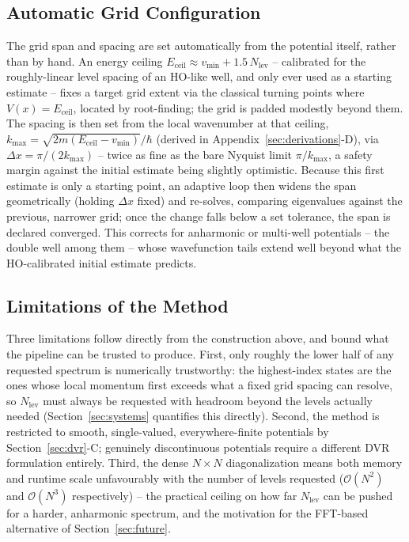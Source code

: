 \documentclass[10pt,conference]{IEEEtran}
\begin{document}
\subsection{Automatic Grid Configuration}
The grid span and spacing are set automatically from the potential itself, rather than by hand. An energy ceiling $E_{\text{ceil}}\approx v_{\min}+1.5\,N_{\text{lev}}$ -- calibrated for the roughly-linear level spacing of an HO-like well, and only ever used as a starting estimate -- fixes a target grid extent via the classical turning points where $V(x)=E_{\text{ceil}}$, located by root-finding; the grid is padded modestly beyond them. The spacing is then set from the local wavenumber at that ceiling, $k_{\max}=\sqrt{2m(E_{\text{ceil}}-v_{\min})}/\hbar$ (derived in Appendix~\ref{sec:derivations}-D), via $\Delta x = \pi/(2k_{\max})$ -- twice as fine as the bare Nyquist limit $\pi/k_{\max}$, a safety margin against the initial estimate being slightly optimistic. Because this first estimate is only a starting point, an adaptive loop then widens the span geometrically (holding $\Delta x$ fixed) and re-solves, comparing eigenvalues against the previous, narrower grid; once the change falls below a set tolerance, the span is declared converged. This corrects for anharmonic or multi-well potentials -- the double well among them -- whose wavefunction tails extend well beyond what the HO-calibrated initial estimate predicts.

\subsection{Limitations of the Method}
Three limitations follow directly from the construction above, and bound what the pipeline can be trusted to produce. First, only roughly the lower half of any requested spectrum is numerically trustworthy: the highest-index states are the ones whose local momentum first exceeds what a fixed grid spacing can resolve, so $N_{\text{lev}}$ must always be requested with headroom beyond the levels actually needed (Section~\ref{sec:systems} quantifies this directly). Second, the method is restricted to smooth, single-valued, everywhere-finite potentials by Section~\ref{sec:dvr}-C; genuinely discontinuous potentials require a different DVR formulation entirely. Third, the dense $N\times N$ diagonalization means both memory and runtime scale unfavourably with the number of levels requested ($\mathcal{O}(N^2)$ and $\mathcal{O}(N^3)$ respectively) -- the practical ceiling on how far $N_{\text{lev}}$ can be pushed for a harder, anharmonic spectrum, and the motivation for the FFT-based alternative of Section~\ref{sec:future}.
\end{document}
